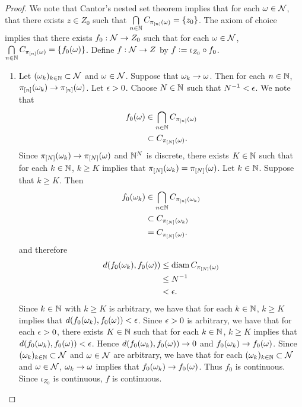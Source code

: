 \documentclass{book}
\begin{document}
\begin{proof}
		We note that Cantor's nested set theorem  implies that for each $\omega \in \mathcal{N}$, that there exists $z \in Z_0$ such that $\bigcap\limits_{n \in \mathbb{N}} C_{\pi_{[n]}(\omega)} = \{z_0\}$. The axiom of choice implies that there exists $f_0:\mathcal{N} \rightarrow Z_0$ such that for each $\omega \in \mathcal{N}$, $\bigcap\limits_{n \in \mathbb{N}} C_{\pi_{[n]}(\omega)} = \{f_0(\omega)\}$. Define $f:\mathcal{N} \rightarrow Z$ by $f \vcentcolon= \iota_{Z_0} \circ f_0$. 
		\begin{enumerate} 
			\item Let $(\omega_k)_{k \in \mathbb{N}} \subset \mathcal{N}$ and $\omega \in \mathcal{N}$. Suppose that $\omega_k \rightarrow \omega$. Then for each $n \in \mathbb{N}$, $\pi_{[n]}(\omega_k) \rightarrow \pi_{[n]}(\omega)$. Let $\epsilon > 0$. Choose $N \in \mathbb{N}$ such that $N^{-1} < \epsilon$. We note that 
			\begin{align*}
				f_0(\omega) 
				& \in \bigcap\limits_{n \in \mathbb{N}} C_{\pi_{[n]}(\omega)} \\
				& \subset C_{\pi_{[N]}(\omega)}.
			\end{align*}
			Since $\pi_{[N]}(\omega_k) \rightarrow \pi_{[N]}(\omega)$ and $\mathbb{N}^N$ is discrete, there exists $K \in \mathbb{N}$ such that for each $k \in \mathbb{N}$, $k \geq K$ implies that $\pi_{[N]}(\omega_k) = \pi_{[N]}(\omega)$. Let $k \in \mathbb{N}$. Suppose that $k \geq K$. Then
			\begin{align*}
				f_0(\omega_k) 
				& \in \bigcap\limits_{n \in \mathbb{N}} C_{\pi_{[n]}(\omega_k)} \\
				& \subset C_{\pi_{[N]}(\omega_k)} \\
				& = C_{\pi_{[N]}(\omega)}.
			\end{align*}
			and therefore
			\begin{align*}
				d(f_0(\omega_k), f_0(\omega))
				& \leq \operatorname{\text{diam}} C_{\pi_{[N]}(\omega)} \\
				& \leq N^{-1} \\
				& < \epsilon.
			\end{align*}
			Since $k \in \mathbb{N}$ with $k \geq K$ is arbitrary, we have that for each $k \in \mathbb{N}$, $k \geq K$ implies that $d(f_0(\omega_k), f_0(\omega)) < \epsilon$. Since $\epsilon > 0$ is arbitrary, we have that for each $\epsilon >0$, there exists $K \in \mathbb{N}$ such that for each $k \in \mathbb{N}$, $k \geq K$ implies that $d(f_0(\omega_k), f_0(\omega)) < \epsilon$. Hence $d(f_0(\omega_k), f_0(\omega)) \rightarrow 0$ and $f_0(\omega_k) \rightarrow f_0(\omega)$. Since $(\omega_k)_{k \in \mathbb{N}} \subset \mathcal{N}$ and $\omega \in \mathcal{N}$ are arbitrary, we have that for each $(\omega_k)_{k \in \mathbb{N}} \subset \mathcal{N}$ and $\omega \in \mathcal{N}$, $\omega_k \rightarrow \omega$ implies that $f_0(\omega_k) \rightarrow f_0(\omega)$. Thus $f_0$ is continuous. Since $\iota_{Z_0}$ is continuous, $f$ is continuous.

\end{enumerate}
\end{proof}
\end{document}
